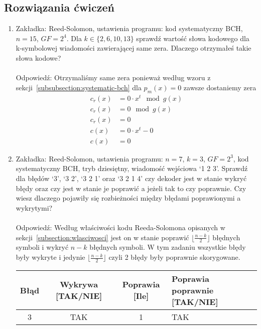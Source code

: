 \subsection*{Rozwiązania ćwiczeń}
\begin{enumerate}
    \item Zakładka: Reed-Solomon, ustawienia programu: kod systematyczny BCH, $n=15$, $GF=2^4$.
    Dla $k \in \{ 2, 6, 10, 13 \}$ sprawdź wartość słowa kodowego dla k-symbolowej wiadomości zawierającej same zera. Dlaczego otrzymałeś takie słowa kodowe? \\ \\
    Odpowiedź: Otrzymaliśmy same zera ponieważ według wzoru z sekcji~\ref{subsubsection:systematic-bch} dla $p_m(x) = 0$ zawsze dostaniemy zera
    \begin{align*}
        c_r(x) &= 0 \cdot x^t \mod g(x) \\
        c_r(x) &= 0 \mod g(x) \\
        c_r(x) &= 0 \\
        c(x) &= 0 \cdot x^t - 0 \\
        c(x) &= 0
    \end{align*}
    \item Zakładka: Reed-Solomon, ustawienia programu: $n = 7$, $k = 3$, $GF = 2^3$,
    kod systematyczny BCH, tryb dziesiętny, wiadomość wejściowa `1 2 3'.
    Sprawdź dla błędów `3', `3 2', `3 2 1' oraz `3 2 1 4' czy dekoder jest w stanie
    wykryć błędy oraz czy jest w stanie je poprawić a jeżeli tak to czy poprawnie.
    Czy wiesz dlaczego pojawiły się rozbieżności między błędami poprawionymi a wykrytymi? \\ \\
    Odpowiedź: Według właściwości kodu Reeda-Solomona opisanych w sekcji~\ref{subsection:wlasciwosci} jest on w stanie poprawić $\lfloor \frac{n-k}{2} \rfloor$ błędnych symboli i wykryć $n-k$ błędnych symboli.
    W tym zadaniu wszystkie błędy były wykryte i jedynie $\lfloor \frac{n-k}{2} \rfloor$ czyli 2 błędy były poprawnie skorygowane.
    \begin{table}[H]
        \renewcommand{\arraystretch}{1.8}
        \centering
        \begin{tabular}{|c|c|c|>{\centering\arraybackslash}p{5cm}|}
            \hline
            \textbf{Błąd} & \textbf{Wykrywa [TAK/NIE]} & \textbf{Poprawia [Ile]} & \textbf{Poprawia poprawnie [TAK/NIE]} \\
            \hline
            3 & TAK & 1 & TAK \\
            \hline

\end{tabular}
\end{table}
\end{enumerate}
